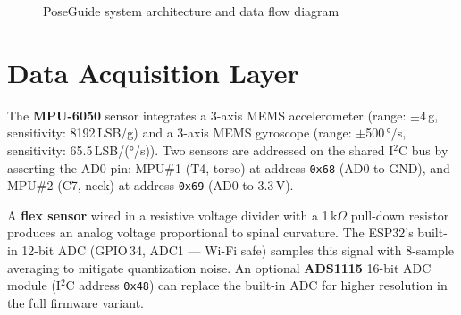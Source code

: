 \documentclass[12pt,a4paper]{report}
\newcommand{\code}[1]{\texttt{\small\color{accentviolet}#1}}
\begin{document}
\begin{figure}[H]
\centering
{}
\caption{PoseGuide system architecture and data flow diagram}
\label{fig:architecture}
\end{figure}

\section{Data Acquisition Layer}

The \textbf{MPU-6050} sensor integrates a 3-axis MEMS accelerometer (range: $\pm$4\,g, sensitivity: 8192\,LSB/g) and a 3-axis MEMS gyroscope (range: $\pm$500\,°/s, sensitivity: 65.5\,LSB/(°/s)). Two sensors are addressed on the shared I$^2$C bus by asserting the AD0 pin: MPU\#1 (T4, torso) at address \code{0x68} (AD0 to GND), and MPU\#2 (C7, neck) at address \code{0x69} (AD0 to 3.3\,V).

A \textbf{flex sensor} wired in a resistive voltage divider with a 1\,k$\Omega$ pull-down resistor produces an analog voltage proportional to spinal curvature. The ESP32's built-in 12-bit ADC (GPIO\,34, ADC1 — Wi-Fi safe) samples this signal with 8-sample averaging to mitigate quantization noise. An optional \textbf{ADS1115} 16-bit ADC module (I$^2$C address \code{0x48}) can replace the built-in ADC for higher resolution in the full firmware variant.
\end{document}
